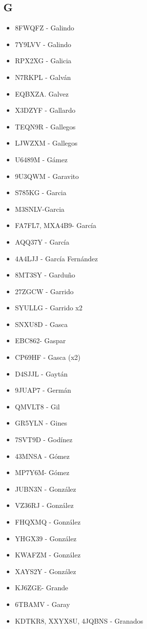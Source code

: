 \subsection*{G}
\begin{itemize}[leftmargin=*,nosep]
\item 8FWQFZ - Galindo
\item 7Y9LVV - Galindo
\item RPX2XG - Galicia
\item N7RKPL - Galván
\item EQBXZA. Galvez
\item X3DZYF  -  Gallardo
\item TEQN9R  -  Gallegos
\item LJWZXM  -  Gallegos
\item U6489M  -  Gámez
\item 9U3QWM - Garavito
\item S785KG  -  Garcia
\item M3SNLV-Garcia
\item FA7FL7, MXA4B9-  García
\item AQQ37Y  -  García
\item 4A4LJJ  -  García Fernández
\item 8MT3SY  -  Garduño
\item 27ZGCW - Garrido
\item SYULLG - Garrido x2
\item SNXU8D - Gasca
\item EBC862- Gaspar
\item CP69HF - Gasca (x2)
\item D4SJJL  -  Gaytán
\item 9JUAP7 - Germán
\item QMVLT8  -  Gil
\item GR5YLN  -  Gines
\item 7SVT9D - Godínez
\item 43MNSA -  Gómez
\item MP7Y6M- Gómez
\item JUBN3N - González
\item VZ36RJ  -  González
\item FHQXMQ -  González
\item YHGX39  -  González
\item KWAFZM  -  González
\item XAYS2Y - González
\item KJ6ZGE- Grande 
\item 6TBAMV - Garay
\item KDTKR8, XXYX8U, 4JQBNS  -  Granados

\end{itemize}
